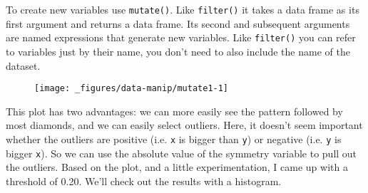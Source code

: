 To create new variables use \texttt{mutate()}. Like \texttt{filter()} it
takes a data frame as its first argument and returns a data frame. Its
second and subsequent arguments are named expressions that generate new
variables. Like \texttt{filter()} you can refer to variables just by
their name, you don't need to also include the name of the dataset.

\begin{Shaded}
\begin{Highlighting}[]
\StringTok{ }
   \StringTok{ }
   \StringTok{ } \NormalTok{+}\StringTok{ }\StringTok{ }\NormalTok{)}
\NormalTok{)}
\CommentTok{#> }

\StringTok{ }
\StringTok{  }\NormalTok{()}
\end{Highlighting}
\end{Shaded}

\begin{figure}[H]
  \centering
  \texttt{[image: \_figures/data-manip/mutate1-1]}
\end{figure}

This plot has two advantages: we can more easily see the pattern
followed by most diamonds, and we can easily select outliers. Here, it
doesn't seem important whether the outliers are positive (i.e.
\texttt{x} is bigger than \texttt{y}) or negative (i.e. \texttt{y} is
bigger \texttt{x}). So we can use the absolute value of the symmetry
variable to pull out the outliers. Based on the plot, and a little
experimentation, I came up with a threshold of 0.20. We'll check out the
results with a histogram.

